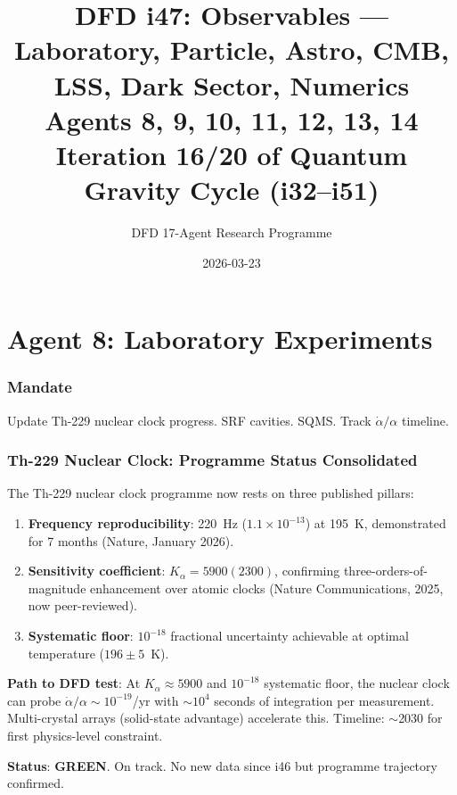 \documentclass[11pt,a4paper]{article}
\title{DFD i47: Observables --- Laboratory, Particle, Astro, CMB, LSS, Dark Sector, Numerics\\[6pt]
\large Agents 8, 9, 10, 11, 12, 13, 14\\[6pt]
\normalsize Iteration 16/20 of Quantum Gravity Cycle (i32--i51)}
\author{DFD 17-Agent Research Programme}
\date{2026-03-23}
\newcommand{\GREEN}{\textcolor{dfdgreen}{\textbf{GREEN}}}
\begin{document}
\maketitle
\tableofcontents
\newpage

\part{Agent 8: Laboratory Experiments}
\label{part:agent8}

\section{Mandate}

Update Th-229 nuclear clock progress. SRF cavities. SQMS. Track $\dot{\alpha}/\alpha$ timeline.

\section{Th-229 Nuclear Clock: Programme Status Consolidated}

\begin{tcolorbox}[colback=green!5!white, colframe=green!60!black,
  title={Th-229 Programme: Three Pillars Established}]

The Th-229 nuclear clock programme now rests on three published pillars:
\begin{enumerate}
\item \textbf{Frequency reproducibility}: 220~Hz ($1.1 \times 10^{-13}$) at 195~K, demonstrated for 7 months (Nature, January 2026).
\item \textbf{Sensitivity coefficient}: $K_\alpha = 5900(2300)$, confirming three-orders-of-magnitude enhancement over atomic clocks (Nature Communications, 2025, now peer-reviewed).
\item \textbf{Systematic floor}: $10^{-18}$ fractional uncertainty achievable at optimal temperature ($196 \pm 5$~K).
\end{enumerate}

\textbf{Path to DFD test}: At $K_\alpha \approx 5900$ and $10^{-18}$ systematic floor, the nuclear clock can probe $\dot{\alpha}/\alpha \sim 10^{-19}$/yr with $\sim 10^4$ seconds of integration per measurement. Multi-crystal arrays (solid-state advantage) accelerate this. Timeline: $\sim$2030 for first physics-level constraint.

\textbf{Status}: \GREEN. On track. No new data since i46 but programme trajectory confirmed.
\end{tcolorbox}
\end{document}
